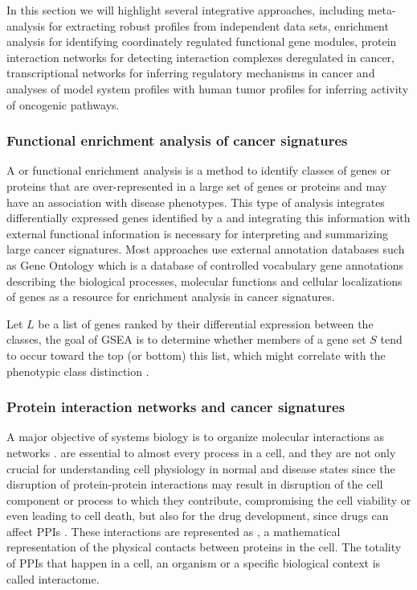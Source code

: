 In this section we will highlight several integrative  approaches, including meta-analysis for extracting robust profiles from independent data sets, enrichment analysis for identifying coordinately regulated functional gene modules, protein interaction networks for detecting interaction complexes deregulated in cancer, transcriptional networks for inferring regulatory mechanisms in cancer and analyses of model system profiles with human tumor profiles for inferring activity of oncogenic pathways.

\subsubsection{Functional enrichment analysis of cancer signatures}

A  or  functional enrichment analysis is a method to identify classes of genes or proteins that are over-represented in a large set of genes or proteins and may have an association with disease phenotypes.
This type of analysis integrates  differentially expressed genes identified by a   and integrating this information with external functional information is necessary for interpreting and summarizing large cancer signatures.
Most approaches use external annotation databases such as Gene Ontology which is a database of controlled vocabulary gene annotations describing the biological processes, molecular functions and cellular localizations of genes as a resource for enrichment analysis in cancer signatures.

Let $L$ be a  list of genes ranked by their differential expression between the classes, the goal of GSEA is to determine whether members of a gene set $S$ tend to occur toward the top (or bottom) this list,  which might correlate with the phenotypic class
distinction \cite{subramanian2005gene}.

\subsubsection{Protein interaction networks and cancer signatures}

A major objective of systems biology is to organize molecular interactions as networks \cite{vinayagam2014integrating}.  are essential to almost every process in a cell, and they are not only crucial for understanding cell physiology in normal and disease states since the disruption of protein-protein interactions may result in disruption of the cell component or process to which they contribute, compromising the cell viability or even leading to cell death, but also for the drug development, since drugs can affect PPIs \cite{PPIs,alzate2009neuroproteomics}.
These interactions are represented as , a mathematical representation of the physical contacts between proteins in the cell.
The totality of PPIs that happen in a cell, an organism or a specific biological context is called interactome.

